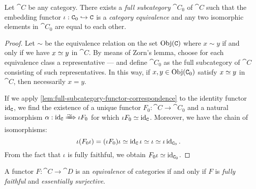 \begin{lemma}
\label{lem:full-subcategory-embedding-equivalence}
Let \(\cat C\) be any category. There exists a \emph{full subcategory}
\(\cat C_0\) of \(\cat C\) such that the embedding functor
\(\iota: \texttt C_0 \hookrightarrow \texttt C\) is a \emph{category equivalence} and any two
isomorphic elements in \(\cat C_0\) are equal to each other.
\end{lemma}

\begin{proof}
Let \(\sim\) be the equivalence relation on the set \(\operatorname{Obj}(\texttt C)\) where
\(x \sim y\) if and only if we have \(x \simeq y\) in \(\cat C\). By means of
Zorn's lemma, choose for each equivalence class a representative --- and
define \(\cat C_0\) as the full subcategory of \(\cat C\) consisting of such
representatives. In this way, if \(x, y \in \operatorname{Obj}(\texttt C_0)\) satisfy
\(x \simeq y\) in \(\cat C\), then necessarily \(x = y\).

If we apply \cref{lem:full-subcategory-functor-correspondence} to the identity
functor \(\operatorname{id}_{\texttt C}\), we find the existence of a unique functor
\(F_0: \cat C \to \cat C_0\) and a natural isomorphism \(\alpha: \Id_{\cat C}
\isonat \iota F_0\) for which \(\iota F_0 \simeq \operatorname{id}_{\texttt C}\). Moreover,
we have the chain of isomorphisms:
\[
\iota (F_0 \iota) = (\iota F_0) \iota \simeq \operatorname{id}_{\texttt{C}} \iota \simeq \iota \simeq
\iota \operatorname{id}_{\texttt C_0}.
\]
From the fact that \(\iota\) is fully faithful, we obtain \(F_0 \iota \simeq
\operatorname{id}_{\texttt C_0}\).
\end{proof}

\begin{proposition}
\label{prop:equiv-cats-iff-fully-faith-and-essen-surj}
A functor \(F: \cat C \to \cat D\) is an \emph{equivalence} of categories if and
only if \(F\) is \emph{fully faithful} and \emph{essentially surjective}.
\end{proposition}

